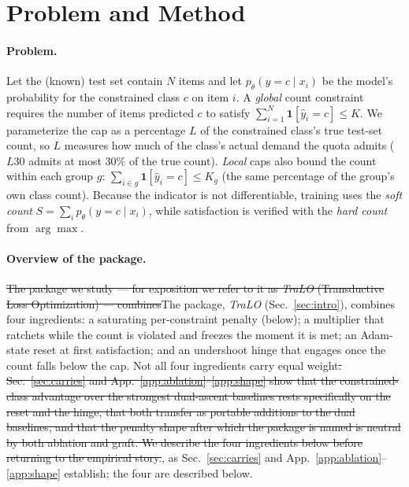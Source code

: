 \documentclass[10pt]{article}
\newcommand{\del}[1]{{\color{red}\sout{#1}}}
\begin{document}
\section{Problem and Method}
\label{sec:method}

\paragraph{Problem.}
Let the (known) test set contain $N$ items and let $p_\theta(y=c\mid x_i)$ be
the model's probability for the constrained class $c$ on item $i$. A
\emph{global} count constraint requires the number of items predicted $c$ to
satisfy $\sum_{i=1}^{N}\mathbf{1}[\hat y_i = c] \le K$. We parameterize the
cap as a percentage $L$ of the constrained class's true test-set count, so
$L$ measures how much of the class's actual demand the quota admits ($L30$
admits at most $30\%$ of the true count). \emph{Local} caps also bound the
count within each group $g$: $\sum_{i\in g}\mathbf{1}[\hat y_i=c]\le K_g$
(the same percentage of the group's own class count). Because the indicator
is not differentiable, training uses the \emph{soft count}
$S=\sum_i p_\theta(y=c\mid x_i)$, while satisfaction is verified with the
\emph{hard count} from $\arg\max$.

\paragraph{Overview of the package.}
\del{The package we study --- for exposition we refer to it as \emph{TraLO}
(Transductive Loss Optimization) --- combines}{\color{blue}The package, \emph{TraLO}
(Sec.~\ref{sec:intro}), combines} four ingredients: a saturating
per-constraint penalty (below); a multiplier that ratchets while the count is
violated and freezes the moment it is met; an Adam-state reset at first
satisfaction; and an undershoot hinge that engages once the count falls below
the cap. Not all four ingredients carry equal weight\del{. Sec.~\ref{sec:carries}
and App.~\ref{app:ablation}--\ref{app:shape} show that the constrained-class
advantage over the strongest dual-ascent baselines rests specifically on the
reset and the hinge, that both transfer as portable additions to the dual
baselines, and that the penalty shape after which the package is named is
neutral by both ablation and graft. We describe the four ingredients below
before returning to the empirical story.}{\color{blue}, as Sec.~\ref{sec:carries}
and App.~\ref{app:ablation}--\ref{app:shape} establish; the four are described
below.}
\end{document}
